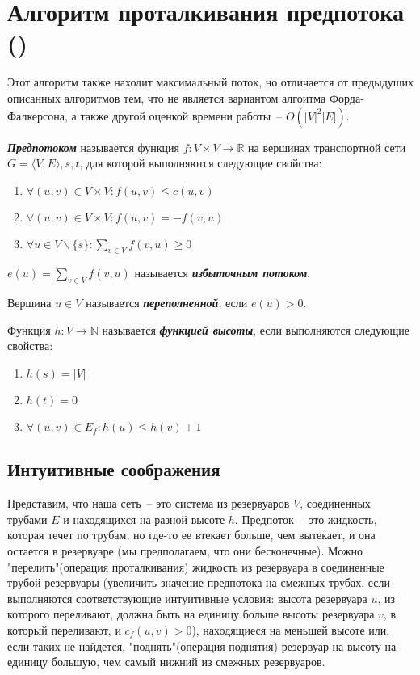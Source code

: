 \let\bf\bfseries
\let\it\itshape
\section{Алгоритм проталкивания предпотока (\groth)}
Этот алгоритм также находит максимальный поток, но отличается от предыдущих описанных алгоритмов тем, что не является вариантом алгоитма Форда-Фалкерсона, а также другой оценкой времени работы~-- $O(|V|^2|E|)$.
\begin{definition}
	{\bf\it Предпотоком} называется функция $f\colon V\times V\to\mathbb{R}$ на вершинах транспортной сети $G=\langle V,E\rangle,s,t$, для которой выполняются следующие свойства:
	\begin{enumerate}
		\item $\forall(u,v)\in V\times V\colon f(u,v)\le c(u,v)$
		\item $\forall(u,v)\in V\times V\colon f(u,v)=-f(v,u)$
		\item $\forall u\in V\smallsetminus\{s\}\colon \sum_{v\in V} f(v,u)\ge0$
	\end{enumerate}
	$e(u)=\sum_{v\in V} f(v,u)$ называется {\bf\it избыточным потоком}.

	Вершина $u\in V$ называется {\bf\it переполненной}, если $e(u)>0$.
\end{definition}
\begin{definition}
	Функция $h\colon V\to\mathbb{N}$ называется {\bf\it функцией высоты}, если выполняются следующие свойства:
	\begin{enumerate}
		\item $h(s)=|V|$
		\item $h(t)=0$
		\item $\forall (u,v)\in E_f\colon h(u)\le h(v)+1$
	\end{enumerate}
\end{definition}
\subsection{Интуитивные соображения}
Представим, что наша сеть~-- это система из резервуаров $V$, соединенных трубами $E$ и находящихся на разной высоте $h$. Предпоток~-- это жидкость, которая течет по трубам, но где-то ее втекает больше, чем вытекает, и она остается в резервуаре (мы предполагаем, что они бесконечные). Можно "перелить"(операция проталкивания) жидкость из резервуара в соединенные трубой резервуары (увеличить значение предпотока на смежных трубах, если выполняются соответствующие интуитивные условия: высота резервуара $u$, из которого переливают, должна быть на единицу больше высоты резервуара $v$, в который переливают, и $c_f(u,v)>0$), находящиеся на меньшей высоте или, если таких не найдется, "поднять"(операция поднятия) резервуар на высоту на единицу большую, чем самый нижний из смежных резервуаров.

